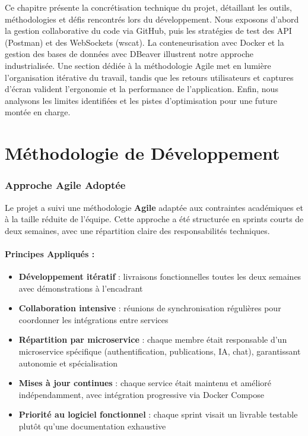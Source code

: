 \documentclass[12pt]{rapportPfe}
\begin{document}
Ce chapitre présente la concrétisation technique du projet, détaillant les outils, méthodologies et défis rencontrés lors du développement. Nous exposons d’abord la gestion collaborative du code via GitHub, puis les stratégies de test des API (Postman) et des WebSockets (wscat). La conteneurisation avec Docker et la gestion des bases de données avec DBeaver illustrent notre approche industrialisée. Une section dédiée à la méthodologie Agile met en lumière l’organisation itérative du travail, tandis que les retours utilisateurs et captures d’écran valident l’ergonomie et la performance de l’application. Enfin, nous analysons les limites identifiées et les pistes d’optimisation pour une future montée en charge.

\section{Méthodologie de Développement}
\subsubsection{Approche Agile Adoptée}
Le projet a suivi une méthodologie \textbf{Agile} adaptée aux contraintes académiques et à la taille réduite de l'équipe. Cette approche a été structurée en sprints courts de deux semaines, avec une répartition claire des responsabilités techniques.

\paragraph{Principes Appliqués :}
\begin{itemize}
    \item \textbf{Développement itératif} : livraisons fonctionnelles toutes les deux semaines avec démonstrations à l'encadrant
    \item \textbf{Collaboration intensive} : réunions de synchronisation régulières pour coordonner les intégrations entre services
    \item \textbf{Répartition par microservice} : chaque membre était responsable d’un microservice spécifique (authentification, publications, IA, chat), garantissant autonomie et spécialisation
    \item \textbf{Mises à jour continues} : chaque service était maintenu et amélioré indépendamment, avec intégration progressive via Docker Compose
    \item \textbf{Priorité au logiciel fonctionnel} : chaque sprint visait un livrable testable plutôt qu'une documentation exhaustive
\end{itemize}
\end{document}
